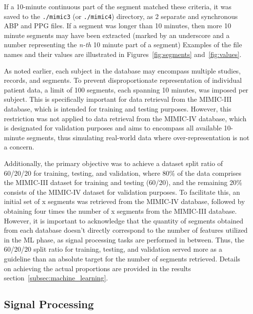 If a 10-minute continuous part of the segment matched these criteria, it was saved to the \texttt{./mimic3} (or \texttt{./mimic4}) directory, as 2 separate and synchronous ABP and PPG files.
If a segment was longer than 10 minutes, then more 10 minute segments may have been extracted (marked by an underscore and a number representing the \textit{n-th} 10 minute part of a segment)
Examples of the file names and their values are illustrated in Figures~\ref{fig:segments} and~\ref{fig:values}.

\newpage
As noted earlier, each subject in the database may encompass multiple studies, records, and segments.
To prevent disproportionate representation of individual patient data, a limit of 100 segments, each spanning 10 minutes, was imposed per subject.
This is specifically important for data retrieval from the MIMIC-III database, which is intended for training and testing purposes.
However, this restriction was not applied to data retrieval from the MIMIC-IV database, which is designated for validation purposes and aims to encompass all available 10-minute segments, thus simulating real-world data where over-representation is not a concern.

Additionally, the primary objective was to achieve a dataset split ratio of 60/20/20 for training, testing, and validation, where 80\% of the data comprises the MIMIC-III dataset for training and testing (60/20), and the remaining 20\% consists of the MIMIC-IV dataset for validation purposes.
To facilitate this, an initial set of x segments was retrieved from the MIMIC-IV database, followed by obtaining four times the number of x segments from the MIMIC-III database.
However, it is important to acknowledge that the quantity of segments obtained from each database doesn't directly correspond to the number of features utilized in the ML phase, as signal processing tasks are performed in between.
Thus, the 60/20/20 split ratio for training, testing, and validation served more as a guideline than an absolute target for the number of segments retrieved.
Details on achieving the actual proportions are provided in the results section~\ref{subsec:machine_learning}.

\subsection{Signal Processing}
\label{subsec:sp_methods}

